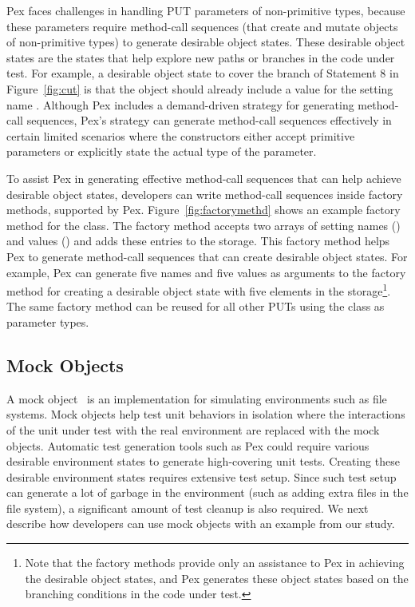 Pex faces challenges in handling PUT parameters of non-primitive types, because these parameters require method-call sequences (that create and mutate objects of non-primitive types) to generate desirable object states. These desirable object states are the states that help explore new paths or branches in the code under test. For example, a desirable object state to cover the  branch of Statement 8 in Figure~\ref{fig:cut} is that the  object should already include a value for the setting name . Although Pex includes a demand-driven strategy for generating method-call sequences, Pex's strategy can generate method-call sequences effectively in certain limited scenarios where the constructors either accept primitive parameters or explicitly state the actual type of the parameter.

To assist Pex in generating effective method-call sequences that can help achieve desirable object states, developers can write method-call sequences inside factory methods, supported by Pex. Figure~\ref{fig:factorymethd} shows an example factory method for the  class. The factory method accepts two arrays of setting names () and values () and adds these entries to the storage. This factory method helps Pex to generate method-call sequences that can create desirable object states. For example, Pex can generate five names and five values as arguments to the factory method for creating a desirable object state with five elements in the storage\footnote{Note that the factory methods provide only an assistance to Pex in achieving the desirable object states, and Pex generates these object states based on the branching conditions in the code under test.}. The same factory method can be reused for all other PUTs using the  class as parameter types.

\subsection{Mock Objects} 
\label{sec:mock}

A mock object~\cite{mockobjects} is an implementation for simulating environments such as file systems. Mock objects help test unit behaviors in isolation where the interactions of the unit under test with the real environment are replaced with the mock objects. Automatic test generation tools such as Pex could require various desirable environment states to generate high-covering unit tests. Creating these desirable environment states requires extensive test setup. Since such test setup can generate a lot of garbage in the environment (such as adding extra files in the file system), a significant amount of test cleanup is also required. We next describe how developers can use mock objects with an example from our study. 

